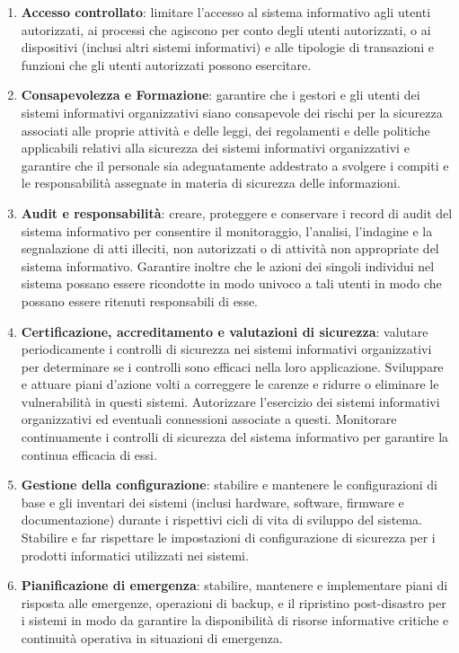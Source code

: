 \begin{enumerate}
    \item \textbf{Accesso controllato}: limitare l'accesso al sistema informativo agli utenti autorizzati, ai processi che agiscono per conto degli utenti autorizzati, o ai dispositivi (inclusi altri sistemi informativi) e alle tipologie di transazioni e funzioni che gli utenti autorizzati possono esercitare.
    \item \textbf{Consapevolezza e Formazione}: garantire che i gestori e gli utenti dei sistemi informativi organizzativi siano consapevole dei rischi per la sicurezza associati alle proprie attività e delle leggi, dei regolamenti e delle politiche applicabili relativi alla sicurezza dei sistemi informativi organizzativi e  garantire che il personale sia adeguatamente addestrato a svolgere i compiti e le responsabilità assegnate in materia di sicurezza delle informazioni.
    \item \textbf{Audit e responsabilità}: creare, proteggere e conservare i record di audit del sistema informativo per consentire il monitoraggio, l'analisi, l'indagine e la segnalazione di atti illeciti, non autorizzati o di attività non appropriate del sistema informativo. Garantire inoltre che le azioni dei singoli individui  nel sistema possano essere ricondotte in modo univoco a tali utenti in modo che possano essere ritenuti responsabili di esse.
    \item \textbf{Certificazione, accreditamento e valutazioni di sicurezza}: valutare periodicamente i controlli di sicurezza nei sistemi informativi organizzativi per determinare se i controlli sono efficaci nella loro applicazione. Sviluppare e attuare piani d'azione volti a correggere le carenze e ridurre o eliminare le vulnerabilità in questi sistemi. Autorizzare l'esercizio dei sistemi informativi organizzativi ed eventuali connessioni associate a questi. Monitorare continuamente i controlli di sicurezza del sistema informativo  per garantire la continua efficacia di essi.
    \item \textbf{Gestione della configurazione}: stabilire e mantenere le configurazioni di base e gli inventari dei sistemi (inclusi hardware, software, firmware e documentazione) durante i rispettivi cicli di vita di sviluppo del sistema. Stabilire e far rispettare le impostazioni di configurazione di sicurezza per i prodotti informatici utilizzati nei sistemi.
    \item \textbf{Pianificazione di emergenza}: stabilire, mantenere e implementare piani di risposta alle emergenze, operazioni di backup, e il ripristino post-disastro per i sistemi in modo da garantire la disponibilità di risorse informative critiche e continuità operativa in situazioni di emergenza.

\end{enumerate}
